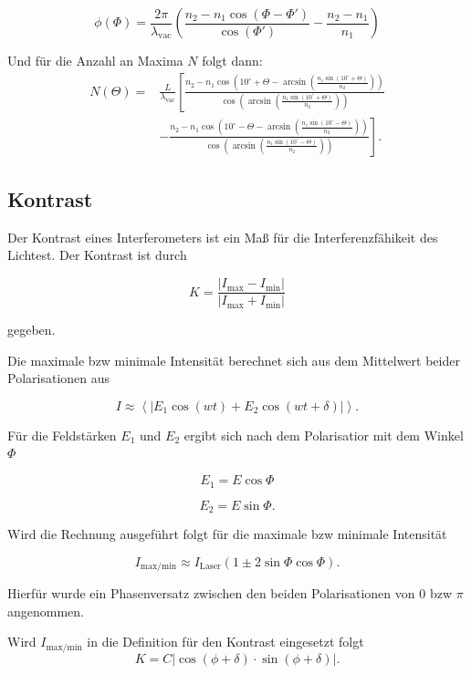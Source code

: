 \begin{equation}
\phi(\Phi) = \frac{2 \pi}{\lambda_\text{vac}} \left( \frac{n_2 - n_1 \cos(\Phi - \Phi')}{\cos(\Phi')} - \frac{n_2 - n_1}{n_1}\right)
\end{equation}

Und für die Anzahl an Maxima $N$ folgt dann:
\begin{equation}
	\begin{split}
		N \left(\Theta\right) = &\frac{L}{\lambda_\text{vac}} \left[\frac{n_2-n_1\cos\left(10^\circ + \Theta-\arcsin\left(\frac{n_1\sin\left(10^\circ+\Theta\right)}{n_2}\right)\right)}{\cos\left(\arcsin\left(\frac{n_1\sin\left(10^\circ+\Theta\right)}{n_2}\right)\right)} \right.\\
		& \left. - \frac{n_2-n_1\cos\left(10^\circ - \Theta-\arcsin\left(\frac{n_1\sin\left(10^\circ-\Theta\right)}{n_2}\right)\right)}{\cos\left(\arcsin\left(\frac{n_1\sin\left(10^\circ-\Theta\right)}{n_2}\right)\right)}\right].
	\end{split}
	\label{glas}
\end{equation}

\subsection{Kontrast}
Der Kontrast eines Interferometers ist ein Maß für die Interferenzfähikeit des Lichtest. Der Kontrast ist durch

\begin{equation}
K = \frac{|I_\text{max} - I_\text{min}|}{|I_\text{max} + I_\text{min}|}
\label{kontra}
\end{equation}

gegeben.

Die maximale bzw minimale Intensität berechnet sich aus dem Mittelwert beider Polarisationen aus

\begin{equation}
I \approx  \left< |E_1 \cos(wt) + E_2 \cos(wt + \delta) | \right>.
\end{equation}

Für die Feldstärken $E_1$ und $E_2$ ergibt sich nach dem Polarisatior mit dem Winkel $\Phi$

\begin{equation}
E_1 = E \cos{\Phi}
\end{equation}

\begin{equation}
E_2 = E \sin{\Phi}.
\end{equation}

Wird die Rechnung ausgeführt folgt für die maximale bzw minimale Intensität

\begin{equation}
I_\text{max/min} \approx I_\text{Laser} \left( 1 \pm 2 \sin{\Phi} \cos{\Phi} \right).
\end{equation}

Hierfür wurde ein Phasenversatz zwischen den beiden Polarisationen von $0$ bzw $\pi$ angenommen.

Wird $I_\text{max/min}$ in die Definition für den Kontrast eingesetzt folgt
\begin{equation}
K = C|\cos(\phi + \delta) \cdot \sin(\phi + \delta)|.
\end{equation}
